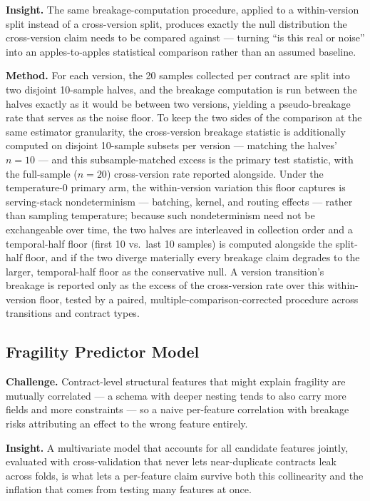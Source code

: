 \documentclass[11pt]{article}
\begin{document}
\textbf{Insight.} The same breakage-computation procedure, applied to a within-version split instead of a cross-version split, produces exactly the null distribution the cross-version claim needs to be compared against --- turning ``is this real or noise'' into an apples-to-apples statistical comparison rather than an assumed baseline.

\textbf{Method.} For each version, the 20 samples collected per contract are split into two disjoint 10-sample halves, and the breakage computation is run between the halves exactly as it would be between two versions, yielding a pseudo-breakage rate that serves as the noise floor. To keep the two sides of the comparison at the same estimator granularity, the cross-version breakage statistic is additionally computed on disjoint 10-sample subsets per version --- matching the halves' $n = 10$ --- and this subsample-matched excess is the primary test statistic, with the full-sample ($n = 20$) cross-version rate reported alongside. Under the temperature-0 primary arm, the within-version variation this floor captures is serving-stack nondeterminism --- batching, kernel, and routing effects --- rather than sampling temperature; because such nondeterminism need not be exchangeable over time, the two halves are interleaved in collection order and a temporal-half floor (first 10 vs.\ last 10 samples) is computed alongside the split-half floor, and if the two diverge materially every breakage claim degrades to the larger, temporal-half floor as the conservative null. A version transition's breakage is reported only as the excess of the cross-version rate over this within-version floor, tested by a paired, multiple-comparison-corrected procedure across transitions and contract types.

\subsection{Fragility Predictor Model}
\textbf{Challenge.} Contract-level structural features that might explain fragility are mutually correlated --- a schema with deeper nesting tends to also carry more fields and more constraints --- so a naive per-feature correlation with breakage risks attributing an effect to the wrong feature entirely.

\textbf{Insight.} A multivariate model that accounts for all candidate features jointly, evaluated with cross-validation that never lets near-duplicate contracts leak across folds, is what lets a per-feature claim survive both this collinearity and the inflation that comes from testing many features at once.
\end{document}
